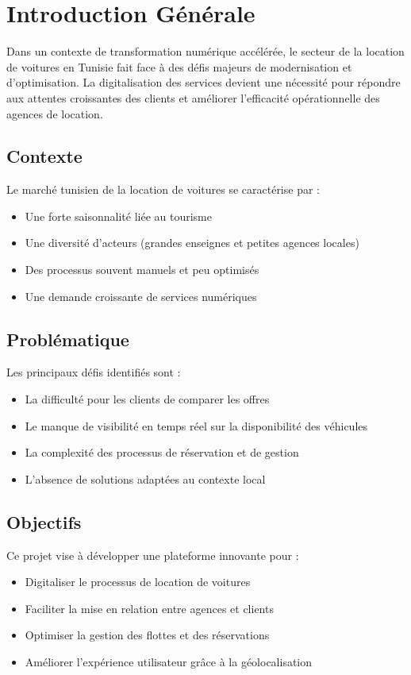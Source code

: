\chapter*{Introduction Générale}

Dans un contexte de transformation numérique accélérée, le secteur de la location de voitures en Tunisie fait face à des défis majeurs de modernisation et d'optimisation. La digitalisation des services devient une nécessité pour répondre aux attentes croissantes des clients et améliorer l'efficacité opérationnelle des agences de location.

\section*{Contexte}
Le marché tunisien de la location de voitures se caractérise par :
\begin{itemize}
    \item Une forte saisonnalité liée au tourisme
    \item Une diversité d'acteurs (grandes enseignes et petites agences locales)
    \item Des processus souvent manuels et peu optimisés
    \item Une demande croissante de services numériques
\end{itemize}

\section*{Problématique}
Les principaux défis identifiés sont :
\begin{itemize}
    \item La difficulté pour les clients de comparer les offres
    \item Le manque de visibilité en temps réel sur la disponibilité des véhicules
    \item La complexité des processus de réservation et de gestion
    \item L'absence de solutions adaptées au contexte local
\end{itemize}

\section*{Objectifs}
Ce projet vise à développer une plateforme innovante pour :
\begin{itemize}
    \item Digitaliser le processus de location de voitures
    \item Faciliter la mise en relation entre agences et clients
    \item Optimiser la gestion des flottes et des réservations
    \item Améliorer l'expérience utilisateur grâce à la géolocalisation
\end{itemize}

